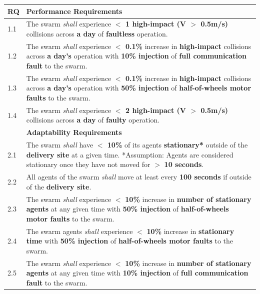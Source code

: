 \documentclass[runningheads]{llncs}
\begin{document}
\begin{table}[!t]
	\centering
	\begin{tabular}{p{5mm} p{116mm} }
		RQ & \textbf{Performance Requirements}\\
		\hline
		1.1 & The swarm \emph{shall} experience \textbf{$<$ 1 high-impact (V $>$ 0.5m/s)} collisions across \textbf{a day} of \textbf{faultless} operation. \\ 
		\hline
		1.2 & The swarm \emph{shall} experience \textbf{$<$ 0.1\%} increase in \textbf{high-impact} collisions across \textbf{a day's} operation with \textbf{10\% injection} of \textbf{full communication fault} to the swarm.\\ 
		\hline
		1.3 & The swarm \emph{shall} experience \textbf{$<$ 0.1\%} increase in \textbf{high-impact} collisions across \textbf{a day's} operation with \textbf{50\% injection} of \textbf{half-of-wheels motor faults} to the swarm.	\\	
		\hline
		1.4 & The swarm \emph{shall} experience \textbf{$<$ 2 high-impact (V $>$ 0.5m/s)} collisions across \textbf{a day} of \textbf{faulty} operation.  \\		[1ex] 		
		\hline
		& \textbf{Adaptability Requirements}\\
		\hline
		2.1 & The swarm \emph{shall} have \textbf{$<$ 10\%} of its agents \textbf{stationary*} outside of the \textbf{delivery site} at a given time.
		*Assumption: Agents are considered stationary once they have not moved for $>$ \textbf{10 seconds}.
		\\ 
		\hline
		2.2 & All agents of the swarm \emph{shall} move at least every \textbf{100 seconds} if outside of the \textbf{delivery site}.\\ 
		\hline
		2.3 & The swarm \emph{shall} experience $<$ \textbf{10\%} increase in \textbf{number of stationary agents} at any given time with \textbf{50\% injection} of \textbf{half-of-wheels motor faults} to the swarm. \\
		\hline
		2.4 & The swarm agents \emph{shall} experience $<$ \textbf{10\%} increase in \textbf{stationary time} with \textbf{50\% injection} of \textbf{half-of-wheels motor faults} to the swarm.\\ 
		\hline
		2.5 & The swarm \emph{shall} experience $<$ \textbf{10\%} increase in \textbf{number of stationary agents} at any given time with \textbf{10\% injection} of \textbf{full communication fault} to the swarm.\\

\end{tabular}
\end{table}
\end{document}
